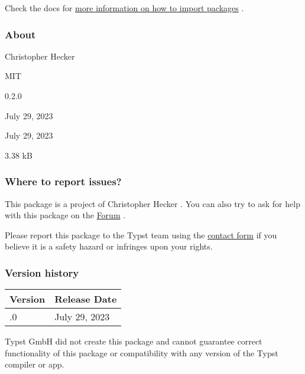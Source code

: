 

Check the docs for
\href{https://typst.app/docs/reference/scripting/\#packages}{more
information on how to import packages} .

\subsubsection{About}\label{about}

\begin{description}
\tightlist
\item[Author :]
Christopher Hecker
\item[License:]
MIT
\item[Current version:]
0.2.0
\item[Last updated:]
July 29, 2023
\item[First released:]
July 29, 2023
\item[Archive size:]
3.38 kB
\href{https://packages.typst.org/preview/diverential-0.2.0.tar.gz}{\pandocbounded{}}
\end{description}

\subsubsection{Where to report issues?}\label{where-to-report-issues}

This package is a project of Christopher Hecker . You can also try to
ask for help with this package on the
\href{https://forum.typst.app}{Forum} .

Please report this package to the Typst team using the
\href{https://typst.app/contact}{contact form} if you believe it is a
safety hazard or infringes upon your rights.

\label{versions}
\subsubsection{Version history}\label{version-history}

\begin{longtable}[]{@{}ll@{}}
\toprule\noalign{}
Version & Release Date \\
\midrule\noalign{}
\endhead
\bottomrule\noalign{}
\endlastfoot
0.2.0 & July 29, 2023 \\
\end{longtable}

Typst GmbH did not create this package and cannot guarantee correct
functionality of this package or compatibility with any version of the
Typst compiler or app.


